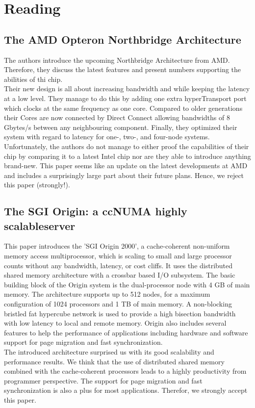 \documentclass{article}
\newcommand{\enterProblemHeader}[1]{
}
\newcommand{\exitProblemHeader}[1]{
}
\newcounter{homeworkProblemCounter} %
\newcommand{\homeworkProblemName}{}
\newenvironment{homeworkProblem}[1][Problem \arabic{homeworkProblemCounter}]{ %
\stepcounter{homeworkProblemCounter} %
\renewcommand{\homeworkProblemName}{#1} %
\section{\homeworkProblemName} %
}{
}
\begin{document}
\begin{homeworkProblem}[Reading]
\subsection{The AMD Opteron Northbridge Architecture}
The authors introduce the upcoming Northbridge Architecture from AMD. Therefore, they discuss the latest features and present numbers supporting the abilities of thi chip. \\
Their new design is all about increasing bandwidth and while keeping the latency at a low level. They manage to do this by adding one extra hyperTransport port which clocks at the same frequency as one core. Compared to older generations their Cores are now connected by Direct Connect allowing bandwidths of 8 Gbytes/s between any neighbouring component. Finally, they optimized their system with regard to latency for one-, two-, and four-node systems. \\
Unfortunately, the authors do not manage to either proof the capabilities of their chip by comparing it to a latest Intel chip nor are they able to introduce anything brand-new. This paper seems like an update on the latest developments at AMD and includes a surprisingly large part about their future plans. Hence, we reject this paper (strongly!).



\subsection{The SGI Origin: a ccNUMA highly scalableserver}
This paper introduces the 'SGI Origin 2000', a cache-coherent non-uniform memory access
multiprocessor, which is scaling to small and large processor counts without any bandwidth,
latency, or cost cliffs. It uses the distributed shared memory architecture with a crossbar
based I/O subsystem. The basic building block of the Origin system is the dual-processor
node with 4 GB of main memory. The architecture supports up to 512 nodes, for a maximum
configuration of 1024 processors and 1 TB of main memory. A non-blocking bristled fat
hypercube network is used to provide a high bisection bandwidth with low latency to local
and remote memory. Origin also includes several features to help the performance of 
applications including hardware and software support for page migration and fast
synchronization.
\\
The introduced architecture surprised us with its good scalability and performance results.
We think that the use of distributed shared memory combined with the cache-coherent 
processors leads to a highly productivity from programmer perspective. The support for 
page migration and fast synchronization is also a plus for most applications. Therefor, we
strongly accept this paper.
\end{homeworkProblem}
\end{document}
